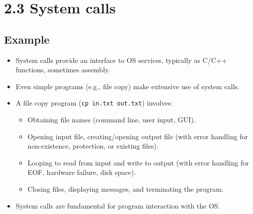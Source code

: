 \section*{2.3 System calls}

\subsection*{Example}
\begin{itemize}
    \item System calls provide an interface to OS services, typically as C/C++ functions, sometimes assembly.
    \item Even simple programs (e.g., file copy) make extensive use of system calls.
    \item A file copy program (\texttt{cp in.txt out.txt}) involves:
    \begin{itemize}
        \item Obtaining file names (command line, user input, GUI).
        \item Opening input file, creating/opening output file (with error handling for non-existence, protection, or existing files).
        \item Looping to read from input and write to output (with error handling for EOF, hardware failure, disk space).
        \item Closing files, displaying messages, and terminating the program.
    \end{itemize}
    \item System calls are fundamental for program interaction with the OS.
\end{itemize}


